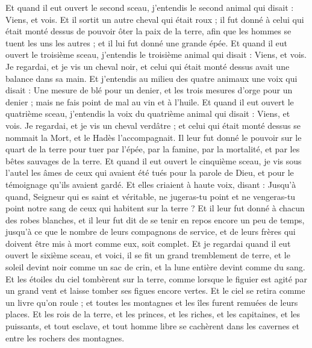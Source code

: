 \begin{multicols}{2}
Et quand il eut ouvert le second sceau, j'entendis le second animal qui disait : Viens, et vois.
Et il sortit un autre cheval qui était roux ; il fut donné à celui qui était monté dessus de pouvoir ôter la paix de la terre, afin que les hommes se tuent les uns les autres ; et il lui fut donné une grande épée.
Et quand il eut ouvert le troisième sceau, j'entendis le troisième animal qui disait : Viens, et vois. Je regardai, et je vis un cheval noir, et celui qui était monté dessus avait une balance dans sa main.
Et j'entendis au milieu des quatre animaux une voix qui disait : Une mesure de blé pour un denier, et les trois mesures d'orge pour un denier ; mais ne fais point de mal au vin et à l'huile.
Et quand il eut ouvert le quatrième sceau, j'entendis la voix du quatrième animal qui disait : Viens, et vois.
Je regardai, et je vis un cheval verdâtre ; et celui qui était monté dessus se nommait la Mort, et le Hadès l'accompagnait. Il leur fut donné le pouvoir sur le quart de la terre pour tuer par l'épée, par la famine, par la mortalité, et par les bêtes sauvages de la terre.
Et quand il eut ouvert le cinquième sceau, je vis sous l'autel les âmes de ceux qui avaient été tués pour la parole de Dieu, et pour le témoignage qu'ils avaient gardé.
Et elles criaient à haute voix, disant : Jusqu'à quand, Seigneur qui es saint et véritable, ne jugeras-tu point et ne vengeras-tu point notre sang de ceux qui habitent sur la terre ?
Et il leur fut donné à chacun des robes blanches, et il leur fut dit de se tenir en repos encore un peu de temps, jusqu'à ce que le nombre de leurs compagnons de service, et de leurs frères qui doivent être mis à mort comme eux, soit complet.
Et je regardai quand il eut ouvert le sixième sceau, et voici, il se fit un grand tremblement de terre, et le soleil devint noir comme un sac de crin, et la lune entière devint comme du sang.
Et les étoiles du ciel tombèrent sur la terre, comme lorsque le figuier est agité par un grand vent et laisse tomber ses figues encore vertes.
Et le ciel se retira comme un livre qu'on roule ; et toutes les montagnes et les îles furent remuées de leurs places.
Et les rois de la terre, et les princes, et les riches, et les capitaines, et les puissants, et tout esclave, et tout homme libre se cachèrent dans les cavernes et entre les rochers des montagnes.

\end{multicols}
